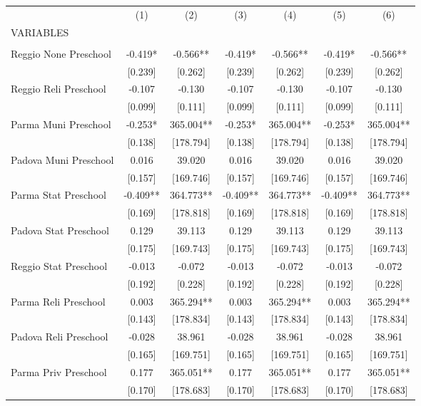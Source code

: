 \begin{tabular}{lcccccc} \hline
 & (1) & (2) & (3) & (4) & (5) & (6) \\
VARIABLES &  &  &  &  &  &  \\ \hline
 &  &  &  &  &  &  \\
Reggio None Preschool & -0.419* & -0.566** & -0.419* & -0.566** & -0.419* & -0.566** \\
 & [0.239] & [0.262] & [0.239] & [0.262] & [0.239] & [0.262] \\
Reggio Reli Preschool & -0.107 & -0.130 & -0.107 & -0.130 & -0.107 & -0.130 \\
 & [0.099] & [0.111] & [0.099] & [0.111] & [0.099] & [0.111] \\
Parma Muni Preschool & -0.253* & 365.004** & -0.253* & 365.004** & -0.253* & 365.004** \\
 & [0.138] & [178.794] & [0.138] & [178.794] & [0.138] & [178.794] \\
Padova Muni Preschool & 0.016 & 39.020 & 0.016 & 39.020 & 0.016 & 39.020 \\
 & [0.157] & [169.746] & [0.157] & [169.746] & [0.157] & [169.746] \\
Parma Stat Preschool & -0.409** & 364.773** & -0.409** & 364.773** & -0.409** & 364.773** \\
 & [0.169] & [178.818] & [0.169] & [178.818] & [0.169] & [178.818] \\
Padova Stat Preschool & 0.129 & 39.113 & 0.129 & 39.113 & 0.129 & 39.113 \\
 & [0.175] & [169.743] & [0.175] & [169.743] & [0.175] & [169.743] \\
Reggio Stat Preschool & -0.013 & -0.072 & -0.013 & -0.072 & -0.013 & -0.072 \\
 & [0.192] & [0.228] & [0.192] & [0.228] & [0.192] & [0.228] \\
Parma Reli Preschool & 0.003 & 365.294** & 0.003 & 365.294** & 0.003 & 365.294** \\
 & [0.143] & [178.834] & [0.143] & [178.834] & [0.143] & [178.834] \\
Padova Reli Preschool & -0.028 & 38.961 & -0.028 & 38.961 & -0.028 & 38.961 \\
 & [0.165] & [169.751] & [0.165] & [169.751] & [0.165] & [169.751] \\
Parma Priv Preschool & 0.177 & 365.051** & 0.177 & 365.051** & 0.177 & 365.051** \\
 & [0.170] & [178.683] & [0.170] & [178.683] & [0.170] & [178.683] \\

\end{tabular}
